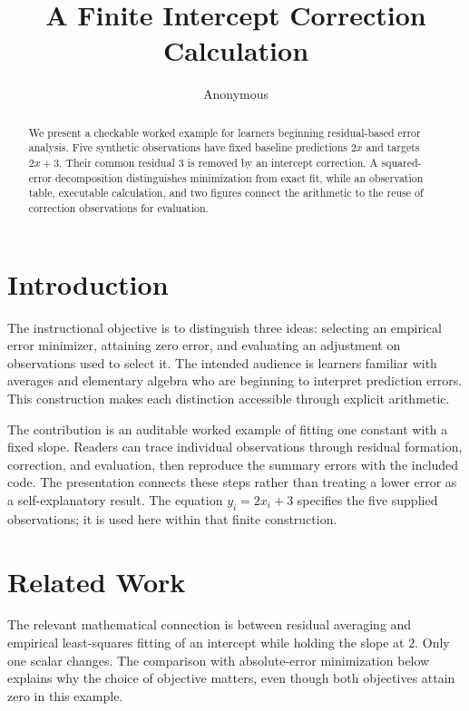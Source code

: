 \documentclass[11pt]{article}
\title{A Finite Intercept Correction Calculation}
\author{Anonymous}
\date{}
\begin{document}
\maketitle

\begin{abstract}
We present a checkable worked example for learners beginning residual-based error analysis. Five synthetic observations have fixed baseline predictions \(2x\) and targets \(2x+3\). Their common residual \(3\) is removed by an intercept correction. A squared-error decomposition distinguishes minimization from exact fit, while an observation table, executable calculation, and two figures connect the arithmetic to the reuse of correction observations for evaluation.
\end{abstract}

\section{Introduction}

The instructional objective is to distinguish three ideas: selecting an empirical error minimizer, attaining zero error, and evaluating an adjustment on observations used to select it. The intended audience is learners familiar with averages and elementary algebra who are beginning to interpret prediction errors. This construction makes each distinction accessible through explicit arithmetic.

The contribution is an auditable worked example of fitting one constant with a fixed slope. Readers can trace individual observations through residual formation, correction, and evaluation, then reproduce the summary errors with the included code. The presentation connects these steps rather than treating a lower error as a self-explanatory result. The equation \(y_i=2x_i+3\) specifies the five supplied observations; it is used here within that finite construction.

\section{Related Work}

The relevant mathematical connection is between residual averaging and empirical least-squares fitting of an intercept while holding the slope at \(2\). Only one scalar changes. The comparison with absolute-error minimization below explains why the choice of objective matters, even though both objectives attain zero in this example.
\end{document}
